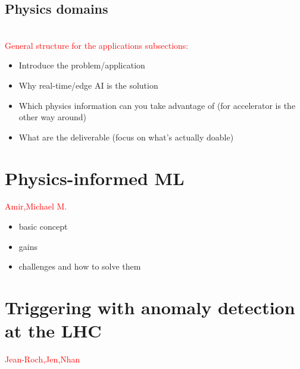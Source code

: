\subsection*{Physics domains}
\\
\noindent \textcolor{red}{General structure for the applications subsections:}
\begin{itemize}
    \item Introduce the problem/application
    \item Why real-time/edge AI is the solution
    \item Which physics information can you take advantage of (for accelerator is the other way around)
    \item What are the deliverable (focus on what's actually doable)
\end{itemize}

\section*{Physics-informed ML}
\textcolor{red}{Amir,Michael M.}

\begin{itemize}
\item basic concept
\item gains
\item challenges and how to solve them
\end{itemize}

\section*{Triggering with anomaly detection at the LHC}
\textcolor{red}{Jean-Roch,Jen,Nhan}


